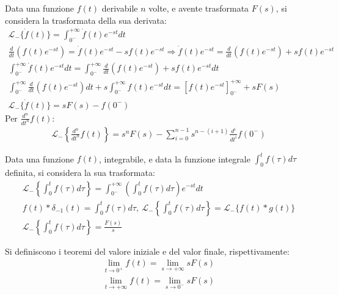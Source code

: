 \documentclass{article}
\numberwithin{equation}{subsection}
\begin{document}
Data una funzione $f(t)$ derivabile $n$ volte, e avente trasformata $F(s)$, si considera la trasformata della sua derivata:
\begin{gather}
    \mathscr{L}_-\{\dot f(t)\}=\displaystyle\int_{0^-}^{+\infty}\dot f(t)e^{-st}dt\\
    \displaystyle\frac{d}{dt}(f(t)e^{-st})=\dot f(t)e^{-st}-sf(t)e^{-st}\Rightarrow\dot f(t)e^{-st}=\frac{d}{dt}(f(t)e^{-st})+sf(t)e^{-st}\\
    \displaystyle\int_{0^-}^{+\infty}\dot f(t)e^{-st}dt=\int_{0^-}^{+\infty}\frac{d}{dt}(f(t)e^{-st})+sf(t)e^{-st}dt\\
    \displaystyle\int_{0^-}^{+\infty}\frac{d}{dt}(f(t)e^{-st})dt+s\int_{0^-}^{+\infty}f(t)e^{-st}dt=\left[f(t)e^{-st}\right]^{+\infty}_{0^-}+sF(s)\\
    \mathscr{L}_-\{\dot f(t)\}=sF(s)-f(0^-)
\end{gather}
Per $\displaystyle\frac{d^n}{dt^n}f(t)$:
\begin{gather}
    \mathscr{L}_-\left\{\displaystyle\frac{d^n}{dt^n}f(t)\right\}=s^nF(s)-\sum_{i=0}^{n-1}s^{n-(i+1)}\frac{d^i}{dt^i}f(0^-)
\end{gather}

Data una funzione $f(t)$, integrabile, e data la funzione integrale $\displaystyle\int_{0}^{t}f(\tau)d\tau$ definita, si considera la sua trasformata:
\begin{gather}
    \mathscr{L}_-\left\{\displaystyle\int_{0}^{t}f(\tau)d\tau\right\}=\int_{0^-}^{+\infty}\left(\int_{0}^{t}f(\tau)d\tau\right)e^{-st}dt\\
    f(t)*\delta_{-1}(t)=\displaystyle\int_{0}^{t}f(\tau)d\tau,\:\mathscr{L}_-\left\{\displaystyle\int_{0}^{t}f(\tau)d\tau\right\}=\mathscr{L}_-\{f(t)*g(t)\}\\
    \mathscr{L}_-\left\{\displaystyle\int_{0}^{t}f(\tau)d\tau\right\}=\frac{F(s)}{s}
\end{gather}

Si definiscono i teoremi del valore iniziale e del valor finale, rispettivamente:
\begin{gather}
    \lim_{t\to0^+}f(t)=\lim_{s\to+\infty}sF(s)\\
    \lim_{t\to+\infty}f(t)=\lim_{s\to0^-}sF(s)
\end{gather}
\end{document}
